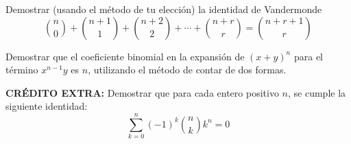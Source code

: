 \begin{problema}
   Demostrar (usando el método de tu elección) la identidad de Vandermonde
\[ \binom{n}{0} + \binom{n+1}{1} + \binom{n+2}{2} + \cdots + \binom{n+r}{r} = \binom{n+r+1}{r} \]

\end{problema}






\begin{problema}
    Demostrar que el coeficiente binomial en la expansión de $(x+y)^n$ para el término $x^{n-1}y$ es $n$, utilizando el método de contar de dos formas.
\end{problema}

\textbf{CRÉDITO EXTRA:} Demostrar que para cada entero positivo $n$, se cumple la siguiente identidad:
\[\sum_{k=0}^n(-1)^k\binom{n}{k}k^n=0\]